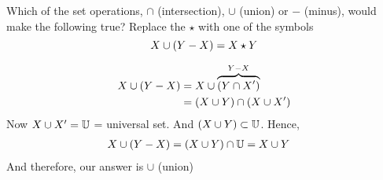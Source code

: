 

\question[3] Which of the set operations, $\cap$ (intersection), $\cup$ (union) or $-$ (minus), would make 
the following true? Replace the $\star$ with one of the symbols
\[ X\cup(Y-X) = X\star Y\]
\watchout

\begin{solution}[\mcq]
  \begin{align}
    X\cup(Y-X) &= X\cup\overbrace{(Y\cap X ')}^{Y-X} \\
           &= (X\cup Y)\cap(X\cup X ') 
  \end{align}
  Now $X\cup X '=\mathbb{U}$ = universal set. And $(X\cup Y)\subset\mathbb{U}$. Hence,
  \begin{align}
    X\cup(Y-X) &= (X\cup Y)\cap\mathbb{U}=X\cup Y
  \end{align}
  And therefore, our answer is $\cup$ (union)
\end{solution}
